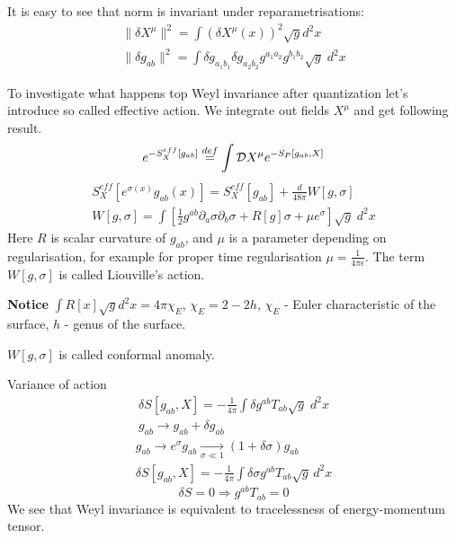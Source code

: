 \documentclass[a4paper,12pt]{article}
\theoremstyle{definition} \newtheorem{Def}{Definition}
\begin{document}
It is easy to see that norm is invariant under reparametrisations:
\begin{equation}
  \label{eq:11}
  \begin{split}
    \|\delta X^{\mu}\|^2 = \int \left(\delta X^{\mu}(x)\right)^2 \sqrt{g} d^2x\\
    \|\delta g_{ab}\|^2 = \int \delta g_{a_1 b_1}\delta g_{a_2 b_2} g^{a_1 a_2} g^{b_1 b_2} \sqrt{g}\; d^2x
  \end{split}
\end{equation}

To investigate what happens top Weyl invariance after quantization let's introduce so called effective action. We integrate out fields $X^{\mu}$ and get following result.
\begin{equation}
  \label{eq:12}
  e^{-S_X^{eff}[g_{ab}]} \overset{def}{=} \int {\cal D}X^{\mu} e^{-S_P [g_{ab},X]}
\end{equation}
\begin{equation}
  \label{eq:13}
  \begin{split}
    S^{eff}_X [e^{\sigma(x)} g_{ab}(x) ] = S_X^{eff}[g_{ab}]+\frac{d}{48\pi}W[g,\sigma]\\
    W[g,\sigma]=\int \left[ \frac{1}{2} g^{ab}\partial_a\sigma \partial_b\sigma+R[g]\sigma+\mu e^{\sigma}\right] \sqrt{g}\; d^2x
  \end{split}
\end{equation}
Here $R$ is scalar curvature of $g_{ab}$, and $\mu$ is a parameter depending on regularisation, for example for proper time regularisation $\mu=\frac{1}{4\pi\epsilon}$. The term $W[g,\sigma]$ is called Liouville's action.

{\bf Notice} $\int R[x] \sqrt{g}d^2x = 4\pi \chi_E$, $\chi_E=2-2h$, $\chi_E$ - Euler characteristic of the surface, $h$ - genus of the surface.

$W[g,\sigma]$  is called conformal anomaly.

Variance of action
\begin{equation}
  \label{eq:14}
  \begin{split}
    \delta S[g_{ab},X] = -\frac{1}{4\pi} \int  \delta g^{ab} T_{ab} \sqrt{g} \; d^2x\\
    g_{ab}\to g_{ab}+\delta g_{ab}
  \end{split}
\end{equation}
\begin{equation}
  \label{eq:15}
  \begin{split}
    g_{ab} \to e^{\sigma} g_{ab} \xrightarrow[\sigma \ll 1]{} (1+\delta\sigma) g_{ab}\\
    \delta S [g_{ab},X] = -\frac{1}{4\pi} \int \delta\sigma g^{ab} T_{ab} \sqrt{g}\, d^2 x
  \end{split}
\end{equation}
\begin{equation}
  \label{eq:16}
    \delta S =0 \Rightarrow g^{ab}T_{ab}=0
\end{equation}
We see that Weyl invariance is equivalent to tracelessness of energy-momentum tensor.
\end{document}
